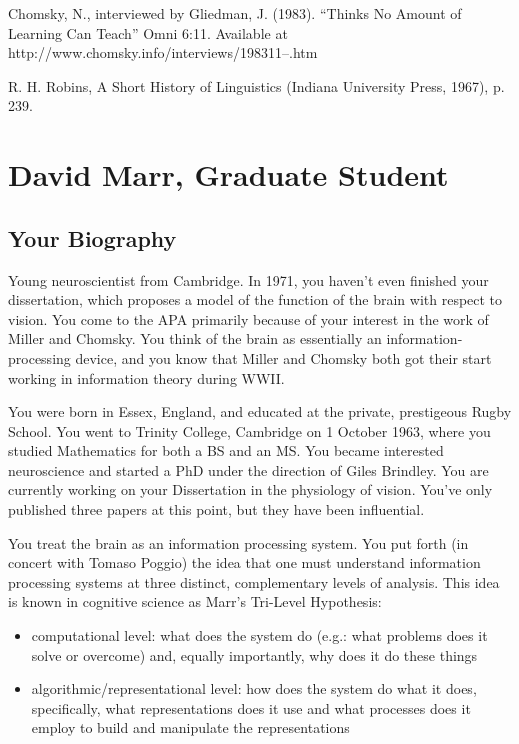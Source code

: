 \begin{refsection}
Chomsky, N., interviewed by Gliedman, J. (1983). “Thinks No Amount of Learning Can Teach” Omni 6:11. Available at http:\slash \slash www.chomsky.info\slash interviews\slash 198311--.htm

R. H. Robins, A Short History of Linguistics (Indiana University Press, 1967), p. 239.

\chapter{David Marr, Graduate Student}
\label{davidmarrgraduatestudent}

\section{Your Biography}
\label{yourbiography}

Young neuroscientist from Cambridge. In 1971, you haven't even finished your dissertation, which proposes a model of the function of the brain with respect to vision. You come to the APA primarily because of your interest in the work of Miller and Chomsky. You think of the brain as essentially an information-processing device, and you know that Miller and Chomsky both got their start working in information theory during WWII.

You were born in Essex, England, and educated at the private, prestigeous Rugby School. You went to Trinity College, Cambridge on 1 October 1963, where you studied Mathematics for both a BS and an MS. You became interested neuroscience and started a PhD under the direction of Giles Brindley. You are currently working on your Dissertation in the physiology of vision. You've only published three papers at this point, but they have been influential.

You treat the brain as an information processing system. You put forth (in concert with Tomaso Poggio) the idea that one must understand information processing systems at three distinct, complementary levels of analysis. This idea is known in cognitive science as Marr's Tri-Level Hypothesis:

\begin{itemize}
\item computational level: what does the system do (e.g.: what problems does it solve or overcome) and, equally importantly, why does it do these things

\item algorithmic\slash representational level: how does the system do what it does, specifically, what representations does it use and what processes does it employ to build and manipulate the representations


\end{itemize}
\end{refsection}
